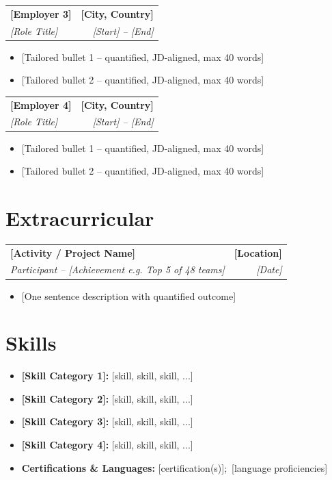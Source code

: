 \documentclass[a4paper,10pt]{article}
\makeatletter
\newcommand{\resumeItem}[1]{%
  \item\small{#1}\vspace{1pt}
}
\newcommand{\resumeJobHeading}[4]{%
  \begin{tabular*}{\textwidth}{l@{\extracolsep{\fill}}r}
    \textbf{#1} & \textbf{#2} \\
    \textit{\small #3} & \textit{\small #4} \\
  \end{tabular*}\vspace{-4pt}
}
\newcommand{\resumeItemListStart}{%
  \begin{itemize}[leftmargin=0.15in, itemsep=0pt, topsep=3pt, parsep=0pt]
}
\newcommand{\resumeItemListEnd}{%
  \end{itemize}\vspace{1pt}
}
\makeatother
\begin{document}
\resumeJobHeading
  {[Employer 3]}{[City, Country]}
  {[Role Title]}{[Start] -- [End]}
\resumeItemListStart
  \resumeItem{[Tailored bullet 1 -- quantified, JD-aligned, max 40 words]}
  \resumeItem{[Tailored bullet 2 -- quantified, JD-aligned, max 40 words]}
\resumeItemListEnd

\resumeJobHeading
  {[Employer 4]}{[City, Country]}
  {[Role Title]}{[Start] -- [End]}
\resumeItemListStart
  \resumeItem{[Tailored bullet 1 -- quantified, JD-aligned, max 40 words]}
  \resumeItem{[Tailored bullet 2 -- quantified, JD-aligned, max 40 words]}
\resumeItemListEnd


\section{Extracurricular}

\resumeJobHeading
  {[Activity / Project Name]}{[Location]}
  {Participant -- [Achievement e.g. Top 5 of 48 teams]}{[Date]}
\resumeItemListStart
  \resumeItem{[One sentence description with quantified outcome]}
\resumeItemListEnd


\section{Skills}

\resumeItemListStart
  \resumeItem{\textbf{[Skill Category 1]:} [skill, skill, skill, ...]}
  \resumeItem{\textbf{[Skill Category 2]:} [skill, skill, skill, ...]}
  \resumeItem{\textbf{[Skill Category 3]:} [skill, skill, skill, ...]}
  \resumeItem{\textbf{[Skill Category 4]:} [skill, skill, skill, ...]}
  \resumeItem{\textbf{Certifications \& Languages:} [certification(s)];\
    [language proficiencies]}
\resumeItemListEnd
\end{document}
